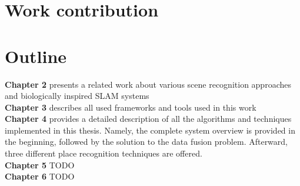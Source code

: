 \section{Work contribution}\label{section:workContribution}


\section{Outline}\label{section:outline}

\textbf{Chapter 2} presents a related work about various scene recognition approaches and biologically inspired SLAM systems \\
\textbf{Chapter 3} describes all used frameworks and tools used in this work\\
\textbf{Chapter 4} provides a detailed description of all the algorithms and techniques implemented in this thesis. Namely, the complete system overview is provided in the beginning, followed by the solution to the data fusion problem. Afterward, three different place recognition techniques are offered.\\
\textbf{Chapter 5} TODO\\
\textbf{Chapter 6} TODO\\
